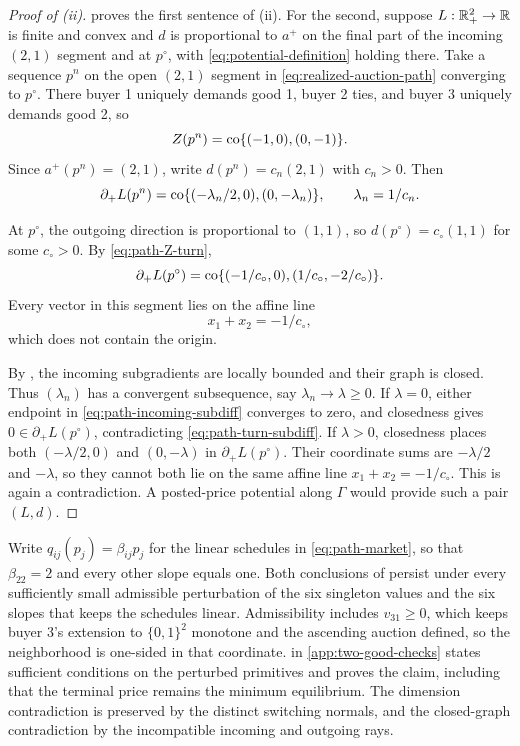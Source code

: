 \begin{proof}[Proof of (ii)]
 proves the first sentence of (ii). For the second, suppose $L:\mathbb{R}_+^2\to\mathbb{R}$ is finite and convex and $d$ is proportional to $a^+$ on the final part of the incoming $(2,1)$ segment and at $p^\circ$, with \eqref{eq:potential-definition} holding there. Take a sequence $p^n$ on the open $(2,1)$ segment in \eqref{eq:realized-auction-path} converging to $p^\circ$. There buyer 1 uniquely demands good 1, buyer 2 ties, and buyer 3 uniquely demands good 2, so
\[
Z(p^n)=\operatorname{co}\{(-1,0),(0,-1)\}.
\]
Since $a^+(p^n)=(2,1)$, write $d(p^n)=c_n(2,1)$ with $c_n>0$. Then
\begin{equation}\label{eq:path-incoming-subdiff}
\partial_+L(p^n)
=\operatorname{co}\{(-\lambda_n/2,0),(0,-\lambda_n)\},
\qquad \lambda_n=1/c_n.
\end{equation}

At $p^\circ$, the outgoing direction is proportional to $(1,1)$, so $d(p^\circ)=c_\circ(1,1)$ for some $c_\circ>0$. By \eqref{eq:path-Z-turn},
\begin{equation}\label{eq:path-turn-subdiff}
\partial_+L(p^\circ)
=\operatorname{co}\{(-1/c_\circ,0),(1/c_\circ,-2/c_\circ)\}.
\end{equation}
Every vector in this segment lies on the affine line
\[
x_1+x_2=-1/c_\circ,
\]
which does not contain the origin.

By , the incoming subgradients are locally bounded and their graph is closed. Thus $(\lambda_n)$ has a convergent subsequence, say $\lambda_n\to\lambda\ge0$. If $\lambda=0$, either endpoint in \eqref{eq:path-incoming-subdiff} converges to zero, and closedness gives $0\in\partial_+L(p^\circ)$, contradicting \eqref{eq:path-turn-subdiff}. If $\lambda>0$, closedness places both $(-\lambda/2,0)$ and $(0,-\lambda)$ in $\partial_+L(p^\circ)$. Their coordinate sums are $-\lambda/2$ and $-\lambda$, so they cannot both lie on the same affine line $x_1+x_2=-1/c_\circ$. This is again a contradiction. A posted-price potential along $\Gamma$ would provide such a pair $(L,d)$.
\end{proof}

Write $q_{ij}(p_j)=\beta_{ij}p_j$ for the linear schedules in \eqref{eq:path-market}, so that $\beta_{22}=2$ and every other slope equals one. Both conclusions of  persist under every sufficiently small admissible perturbation of the six singleton values and the six slopes that keeps the schedules linear. Admissibility includes $v_{31}\ge0$, which keeps buyer 3's extension to $\{0,1\}^2$ monotone and the ascending auction defined, so the neighborhood is one-sided in that coordinate.  in \ref{app:two-good-checks} states sufficient conditions on the perturbed primitives and proves the claim, including that the terminal price remains the minimum equilibrium. The dimension contradiction is preserved by the distinct switching normals, and the closed-graph contradiction by the incompatible incoming and outgoing rays.

